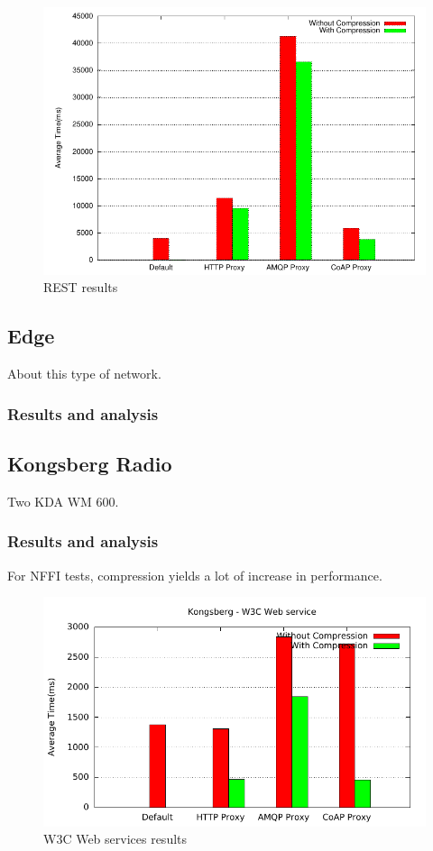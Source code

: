 \begin{figure}[H]
\center
\includegraphics[scale=0.75]{../results/cnr/rest/result.pdf}
\caption{REST results}
\end{figure}


\subsection{Edge}

About this type of network.


\subsubsection{Results and analysis}

\subsection{Kongsberg Radio}

Two KDA WM 600.


\subsubsection{Results and analysis}

For NFFI tests, compression yields a lot of increase in performance.

\begin{figure}[H]
\center
\includegraphics[scale=0.75]{../results/kongsberg/nffi/out.pdf}
\caption{W3C Web services results}
\end{figure}

